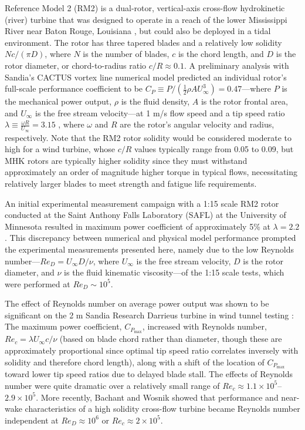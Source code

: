 \documentclass[10pt,letterpaper]{article}
\begin{document}
Reference Model 2 (RM2) is a dual-rotor, vertical-axis cross-flow hydrokinetic
(river) turbine that was designed to operate in a reach of the lower Mississippi
River near Baton Rouge, Louisiana \cite{Barone2011, Neary2011}, but could also
be deployed in a tidal environment. The rotor has three tapered blades and a
relatively low solidity $Nc/(\pi D)$, where $N$ is the number of blades, $c$ is
the chord length, and $D$ is the rotor diameter, or chord-to-radius ratio $c/R
\approx 0.1$. A preliminary analysis with Sandia's CACTUS vortex line numerical
model \cite{Murray2011} predicted an individual rotor's full-scale performance
coefficient to be $C_P \equiv P / \left( \frac{1}{2} \rho A U_\infty^3 \right) =
0.47$---where $P$ is the mechanical power output, $\rho$ is the fluid density,
$A$ is the rotor frontal area, and $U_\infty$ is the free stream velocity---at 1
m/s flow speed and a tip speed ratio $\lambda \equiv \frac{\omega R}{U_\infty} =
3.15$ \cite{Barone2011}, where $\omega$ and $R$ are the rotor's angular velocity
and radius, respectively. Note that the RM2 rotor solidity would be considered
moderate to high for a wind turbine, whose $c/R$ values typically range from
0.05 to 0.09, but MHK rotors are typically higher solidity since they must
withstand approximately an order of magnitude higher torque in typical flows,
necessitating relatively larger blades to meet strength and fatigue life
requirements.

An initial experimental measurement campaign with a 1:15 scale RM2 rotor
conducted at the Saint Anthony Falls Laboratory (SAFL) at the University of
Minnesota resulted in maximum power coefficient of approximately 5\% at $\lambda
= 2.2$ \cite{Hill2014}. This discrepancy between numerical and physical model
performance prompted the experimental measurements presented here, namely due to
the low Reynolds number---$Re_D = U_\infty D / \nu$, where $U_\infty$ is the
free stream velocity, $D$ is the rotor diameter, and $\nu$ is the fluid
kinematic viscosity---of the 1:15 scale tests, which were performed at $Re_D
\sim 10^5$.

The effect of Reynolds number on average power output was shown to be
significant on the 2 m Sandia Research Darrieus turbine in wind tunnel testing
\cite{Blackwell1976}: The maximum power coefficient, $C_{P_{\max}}$, increased
with Reynolds number, $Re_c=\lambda U_\infty c / \nu$ (based on blade chord
rather than diameter, though these are approximately proportional since optimal
tip speed ratio correlates inversely with solidity and therefore chord length),
along with a shift of the location of $C_{P_{\max}}$ toward lower tip speed
ratios due to delayed blade stall. The effects of Reynolds number were quite
dramatic over a relatively small range of $Re_c \approx 1.1 \times 10^5$--$2.9
\times 10^5$. More recently, Bachant and Wosnik \cite{Bachant2014,
    Bachant2016-RVAT-Re-dep} showed that performance and near-wake characteristics
of a high solidity cross-flow turbine became Reynolds number independent at
$Re_D \approx 10^6$ or $Re_c \approx 2 \times 10^5$.
\end{document}
